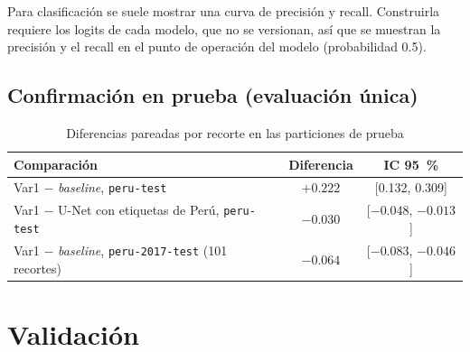 Para clasificación se suele mostrar una curva de precisión y recall. Construirla requiere los logits
de cada modelo, que no se versionan, así que se muestran la precisión y el recall en el punto de
operación del modelo (probabilidad 0.5).

\subsection{Confirmación en prueba (evaluación única)}

\begin{table}[H]
    \centering
    \small
    \caption{Diferencias pareadas por recorte en las particiones de prueba}
    \label{tab:sprint_ab_prueba}
    \begin{tabular}{|p{8.5cm}|c|c|}
        \hline
        \textbf{Comparación} & \textbf{Diferencia} & \textbf{IC 95~\%} \\
        \hline
        Var1 $-$ \textit{baseline}, \texttt{peru-\allowbreak{}test} & $+0.222$ & [0.132, 0.309] \\
        \hline
        Var1 $-$ U-Net con etiquetas de Perú, \texttt{peru-\allowbreak{}test} & $-0.030$ & [$-0.048$, $-0.013$] \\
        \hline
        Var1 $-$ \textit{baseline}, \texttt{peru-\allowbreak{}2017-\allowbreak{}test} (101 recortes) & $-0.064$ & [$-0.083$, $-0.046$] \\
        \hline
    \end{tabular}
\end{table}

\section{Validación}

